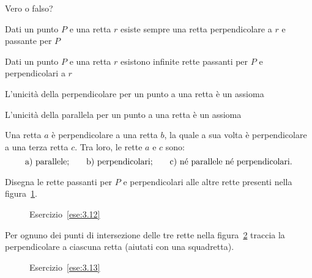 \begin{esercizio}
\label{ese:3.10}
Vero o falso?
\begin{enumeratea}
\item Dati un punto \(P\) e una retta \(r\) esiste sempre una retta 
perpendicolare a \(r\) e passante per \(P\)\tab\hfill\boxV\quad\boxF
\item Dati un punto \(P\) e una retta \(r\) esistono infinite rette 
passanti per \(P\) e perpendicolari a \(r\)\tab\hfill\boxV\quad\boxF
\item L'unicità della perpendicolare per un punto a una retta è un 
assioma\hfill\boxV\quad\boxF
\item L'unicità della parallela per un punto a una retta è un 
assioma\hfill\boxV\quad\boxF
\end{enumeratea}
\end{esercizio}

\begin{esercizio}
\label{ese:3.11}
Una retta \(a\) è perpendicolare a una retta \(b\), la quale a sua volta 
è perpendicolare a una terza retta \(c\). Tra loro, le rette \(a\) e \(c\) 
sono:
\[\text{a) parallele;\qquad b) perpendicolari;\qquad c) né parallele 
né perpendicolari.}\]
\end{esercizio}

\begin{esercizio}
\label{ese:3.12}
Disegna le rette passanti per \(P\) e perpendicolari alle altre rette 
presenti nella figura~\ref{fig:ese3.12}.
\end{esercizio}

\begin{inaccessibleblock}
 \begin{figure}[htb]
\centering
\caption{Esercizio~\ref{ese:3.12}}\label{fig:ese3.12}
\end{figure}
\end{inaccessibleblock}

\begin{esercizio}
\label{ese:3.13}
Per ognuno dei punti di intersezione delle tre rette nella 
figura~\ref{fig:ese3.13} traccia la perpendicolare a ciascuna retta 
(aiutati con una squadretta).
\end{esercizio}

\begin{inaccessibleblock}
 \begin{figure}[htb]
\centering
\caption{Esercizio~\ref{ese:3.13}}\label{fig:ese3.13}
\end{figure}
\end{inaccessibleblock}

